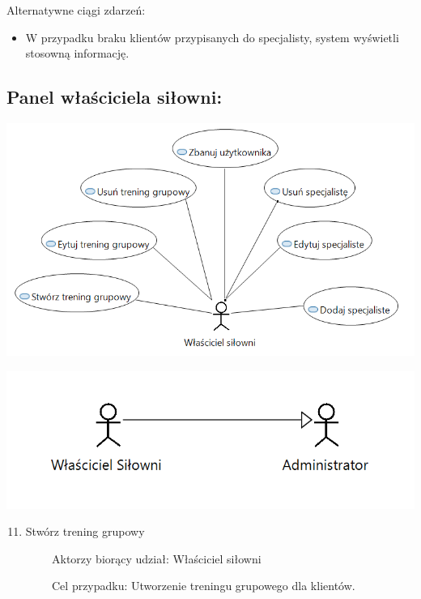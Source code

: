 \documentclass[
]{article}
\providecommand{\tightlist}{%
  \setlength{\itemsep}{0pt}\setlength{\parskip}{0pt}}
\begin{document}
{Alternatywne ciągi zdarzeń:}

\begin{itemize}
\tightlist
\item
  {W przypadku braku klientów przypisanych do specjalisty, system
  wyświetli stosowną informację.}
\end{itemize}

{}

\hypertarget{h.2ol8m2kl4itm}{%
\subsection{\texorpdfstring{{Panel właściciela
siłowni:}}{Panel właściciela siłowni:}}\label{h.2ol8m2kl4itm}}

{\includegraphics{diagrams/use_cases/wlasciciel_silowni.png}}

{\includegraphics{diagrams/use_cases/wlasciciel_silowni_hierarchy.png}}

\begin{enumerate}
\setcounter{enumi}{10}
\tightlist
\item
  {Stwórz trening grupowy}
\end{enumerate}

{~~~~~~~~}{Aktorzy biorący udział: Właściciel siłowni}

{~~~~~~~~Cel przypadku: Utworzenie treningu grupowego dla klientów.}
\end{document}

